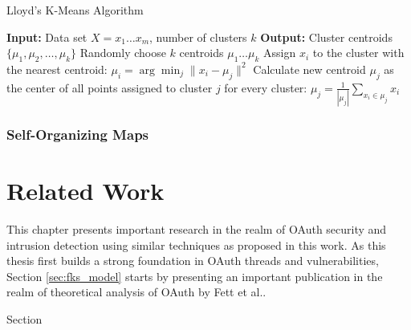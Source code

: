 \documentclass[
    fontsize=12pt,
    headings=small,
    parskip=half,           %
    bibliography=totoc,
    numbers=noenddot,       %
    open=any,               %
    ]{scrreprt}
\begin{document}
\begin{algorithm}
	\label{fig:kmeans}
	\caption{Lloyd's K-Means Algorithm}
	\begin{algorithmic}[1]
		\State \textbf{Input:} Data set $X = {x_1 \ldots x_m}$, number of clusters $k$
		\State \textbf{Output:} Cluster centroids $\{\mu_1, \mu_2, \ldots, \mu_k\}$
		\State Randomly choose $k$ centroids ${\mu_1 \ldots \mu_k}$ 
		\Repeat
			\State Assign $x_i$ to the cluster with the nearest centroid: $\mu_i = \arg\min_j \|x_i - \mu_j\|^2$
		\EndFor
			\State Calculate new centroid $\mu_j$ as the center of all points assigned to cluster $j$ for every cluster: $\mu_j = \frac{1}{|\mu_j|} \sum_{x_i \in \mu_j} x_i$
		\EndFor
	\end{algorithmic}
\end{algorithm}

\subsection{Self-Organizing Maps}
\lipsum[1-2]

\chapter{Related Work}
\label{chap:related_work}
This chapter presents important research in the realm of OAuth security and intrusion detection using similar techniques as proposed in this work. As this thesis first builds a strong foundation in OAuth threads and vulnerabilities, Section \ref{sec:fks_model} starts by presenting an important publication in the realm of theoretical analysis of OAuth by Fett et al..

Section 
\end{document}
